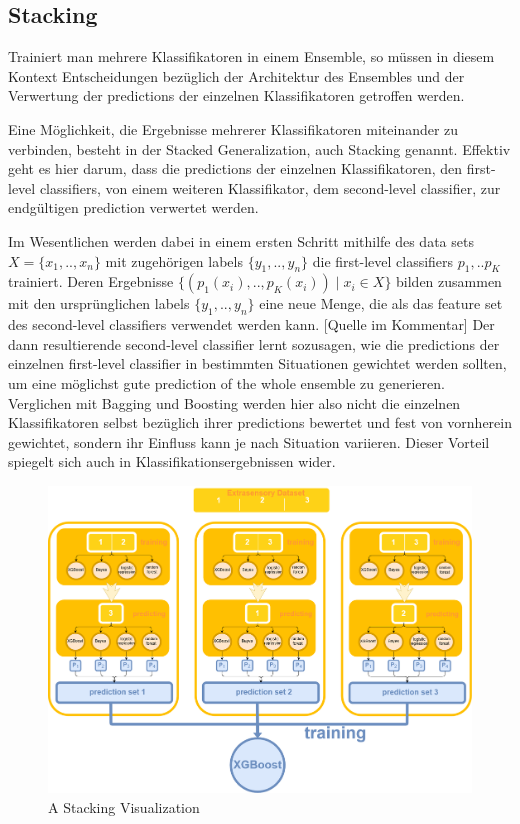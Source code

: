 \subsection{Stacking}

Trainiert man mehrere Klassifikatoren in einem Ensemble, so müssen in diesem Kontext   Entscheidungen bezüglich der Architektur des Ensembles und der Verwertung der predictions der einzelnen Klassifikatoren getroffen werden.

Eine Möglichkeit, die Ergebnisse mehrerer Klassifikatoren miteinander zu verbinden, besteht in der Stacked Generalization, auch Stacking genannt. Effektiv geht es hier darum, dass die predictions der einzelnen Klassifikatoren, den first-level classifiers, von einem weiteren Klassifikator, dem second-level classifier, zur endgültigen prediction verwertet werden. 

Im Wesentlichen werden dabei in einem ersten Schritt mithilfe des data sets $X = \{x_1, .. ,x_n\}$ mit zugehörigen labels $\{y_1, .. ,y_n\}$ die first-level classifiers $p_1, .. p_K$ trainiert. Deren Ergebnisse $\{(p_1(x_i), .. , p_K(x_i)) \mid x_i \in X\}$ bilden zusammen mit den ursprünglichen labels $\{y_1, .. ,y_n\}$ eine neue Menge, die als das feature set des second-level classifiers verwendet werden kann. [Quelle im Kommentar] %
Der dann resultierende second-level classifier lernt sozusagen, wie die predictions der einzelnen first-level classifier in bestimmten Situationen gewichtet werden sollten, um eine möglichst gute prediction of the whole ensemble zu generieren. Verglichen mit Bagging und Boosting werden hier also nicht die einzelnen Klassifikatoren selbst bezüglich ihrer predictions bewertet und fest von vornherein gewichtet, sondern ihr Einfluss kann je nach Situation variieren. Dieser Vorteil spiegelt sich auch in Klassifikationsergebnissen wider. 


\begin{figure}[H]
	\begin{center}
		\includegraphics[width=\textwidth]{images/stacking_diagram.png}
		\caption{A Stacking Visualization}
		\label{abb:stacking}
	\end{center}		
\end{figure}	

